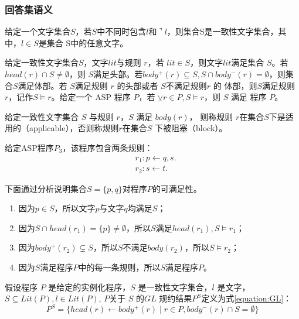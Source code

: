 \subsubsection{回答集语义}
\begin{definition}[一致性文字集合]
    给定一个文字集合$S$，若$S$中不同时包含$l$和$\urcorner l$，则集合S是一致性文字集合，其中，$l \in S$是集合
    S中的任意文字。
\end{definition}
\begin{definition}
    给定一致性文字集合$S$，文字$lit$与规则 $r$，若
$lit \in S$，则文字$ lit $满足集合 $S$。若 $head(r)\cap S \neq \emptyset$，则 $S $满足头部。若$ body^+(r) \subseteq 
S, S ∩ body^−(r) = \emptyset$，则集合$ S $满足体部。若 $S $满足规则 $r$ 的头部或者 $S $不满足规则$ r$ 的
体部，则$ S$满足规则 $r$，记作$ S \models r$。给定一个 ASP 程序 $P$，若 $\veebar r \in P, S \models r$，则 $S$ 满足
程序 $P$。
\end{definition}
\begin{definition}[规则的适用与阻塞]
    给定一致性文字集合 $S$ 与规则 $r$，$S$ 满足 $body(r)$，
则称规则 $r $在集合$S $下是适用的（applicable），否则称规则$ r $在集合$ S$ 下被阻塞（block）。
\end{definition}
\begin{example}
    给定ASP程序$P_3$，该程序包含两条规则：
    \begin{align*}
        &r_1: p \leftarrow q, s. \\ 
        &r_2: s \leftarrow t.
    \end{align*}
\end{example}
下面通过分析说明集合$S=\{ p, q\}$对程序$P$的可满足性。
\begin{enumerate}[itemsep=0pt,parsep=0pt]
    \item 因为$p\in S$，所以文字$p$与文字$q$均满足$S$；
    \item 因为$S \cap head(r_1) = \{ p \} \neq \emptyset$，所以$S$满足$head(r_1), S \models r_1$；
    \item 因为$body^+(r_2) \subsetneq S$，所以$S$不满足$body(r_2)$，所以$S \models r_2$；
    \item 因为$S$满足程序$P$中的每一条规则，所以$S$满足程序$P$。
\end{enumerate}
\begin{definition}
    假设程序 $P$ 是给定的实例化程序，$S$
是一致性文字集合，$l$ 是文字，$S \subseteq  Lit(P), l \in Lit(P)$, $P $关于 $S$ 的$ GL$ 规约结果$ P^S$定义为式\eqref{equation:GL}：
\begin{equation}
    P^S = \{ head(r) \leftarrow body^+(r) \mid r \in P, body^-(r) \cap S = \emptyset \} \label{equation:GL}
\end{equation}
\end{definition}
